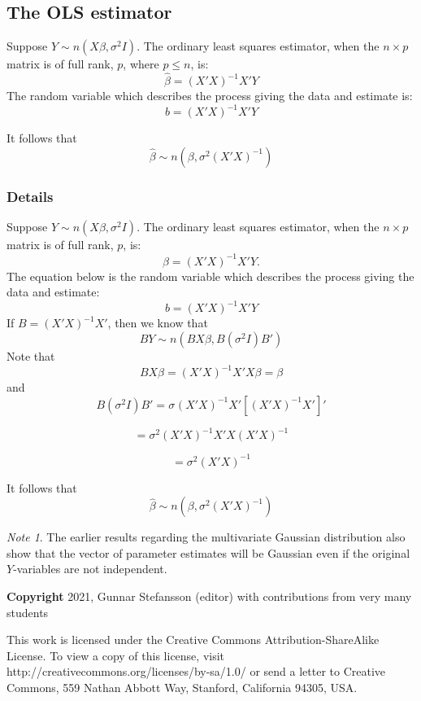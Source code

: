 \documentclass[12pt,a4paper]{article}
\theoremstyle{regla}
\theoremstyle{remark}
\newtheorem{notes}{Note}[section]
\theoremstyle{definition}
\theoremstyle{nonumberbreak}
\begin{document}
\subsection{The OLS estimator}
\begin{fbox}
\begin{minipage}{0.97\textwidth}
Suppose $Y \sim n(X \beta,\sigma^2 I)$. The ordinary least squares estimator, when the $n \times p$ matrix is of full rank, $p$, where $p\leq n$, is:
$$ \hat{\beta} = (X'X)^{-1}X'Y$$
The random variable which describes the process giving the data and estimate is:
$$
b = (X'X)^{-1}X'Y
$$

It follows that
$$\hat{\beta} \sim n(\beta,\sigma^{2}(X'X)^{-1})$$

\end{minipage}
\end{fbox}
\subsubsection{Details}
Suppose $Y \sim n(X \beta,\sigma^2I)$. The ordinary least squares estimator, when the $n \times p$ matrix is of full rank, $p$, is:
$$ \hat{\beta} = (X'X)^{-1}X'Y.$$
The equation below is the random variable which describes the process giving the data and estimate:
$$ b = (X'X)^{-1}X'Y $$
If $B = (X'X)^{-1}X'$, then we know that
$$ BY \sim n(B X \beta, B(\sigma^{2}I)B')$$
Note that 
$$ BX\beta = (X'X)^{-1}X'X\beta=\beta $$
and
$$ B(\sigma^{2}I)B' = \sigma^{}(X'X)^{-1}X'[(X'X)^{-1}X']' $$

$$ = \sigma^{2}(X'X)^{-1}X'X(X'X)^{-1}$$

$$ = \sigma^{2}(X'X)^{-1} $$

It follows that
$$ \hat{\beta} \sim n(\beta,\sigma^{2}(X'X)^{-1}) $$

\begin{notes}
The earlier results regarding the multivariate Gaussian distribution also show that the vector of parameter estimates will be Gaussian even if the original $Y$-variables are not independent.
\end{notes}

{\bf Copyright}
2021, Gunnar Stefansson (editor) with contributions from very many students

This work is licensed under the Creative Commons
Attribution-ShareAlike License. To view a copy of this license, visit
http://creativecommons.org/licenses/by-sa/1.0/ or send a letter to
Creative Commons, 559 Nathan Abbott Way, Stanford, California 94305,
USA.
\clearpage
\end{document}
